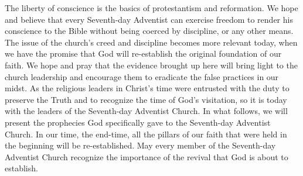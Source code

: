 The liberty of conscience is the basics of protestantism and reformation. We hope and believe that every Seventh-day Adventist can exercise freedom to render his conscience to the Bible without being coerced by discipline, or any other means. The issue of the church's creed and discipline becomes more relevant today, when we have the promise that God will re-establish the original foundation of our faith. We hope and pray that the evidence brought up here will bring light to the church leadership and encourage them to eradicate the false practices in our midst. As the religious leaders in Christ’s time were entrusted with the duty to preserve the Truth and to recognize the time of God’s visitation, so it is today with the leaders of the Seventh-day Adventist Church. In what follows, we will present the prophecies God specifically gave to the Seventh-day Adventist Church. In our time, the end-time, all the pillars of our faith that were held in the beginning will be re-established. May every member of the Seventh-day Adventist Church recognize the importance of the revival that God is about to establish.
